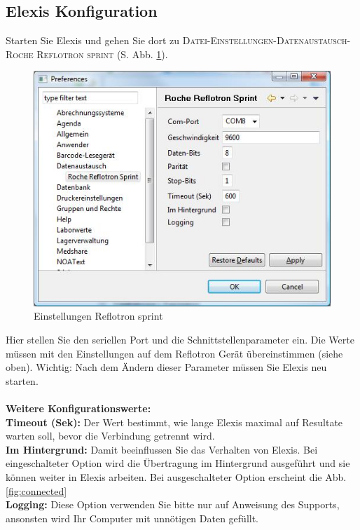 \documentclass[a4paper]{scrartcl}
\begin{document}
\subsection{Elexis Konfiguration}
Starten Sie Elexis und gehen Sie dort zu \textsc{Datei-Einstellungen-Datenaustausch-Roche Reflotron sprint} (S. Abb. \ref{fig:config}).
\begin{figure}[h]
    \includegraphics{config}
    \caption{Einstellungen Reflotron sprint}
    \label{fig:config}
\end{figure}
Hier stellen Sie den seriellen Port und die Schnittstellenparameter ein. Die Werte m\"ussen mit den Einstellungen auf dem Reflotron Ger\"at \"ubereinstimmen (siehe oben). Wichtig: Nach dem \"Andern dieser Parameter m\"ussen Sie Elexis neu starten.\\
\\
\textbf{Weitere Konfigurationswerte:}\\
\textbf{Timeout (Sek):} Der Wert bestimmt, wie lange Elexis maximal auf Resultate warten soll, bevor die Verbindung getrennt wird.\\
\textbf{Im Hintergrund:} Damit beeinflussen Sie das Verhalten von Elexis. Bei eingeschalteter Option wird die \"Ubertragung im Hintergrund ausgef\"uhrt und sie k\"onnen weiter in Elexis arbeiten. Bei ausgeschalteter Option erscheint die Abb. \ref{fig:connected}\\
\textbf{Logging:} Diese Option verwenden Sie bitte nur auf Anweisung des Supports, ansonsten wird Ihr Computer mit unn\"otigen Daten gef\"ullt.\\
\end{document}
